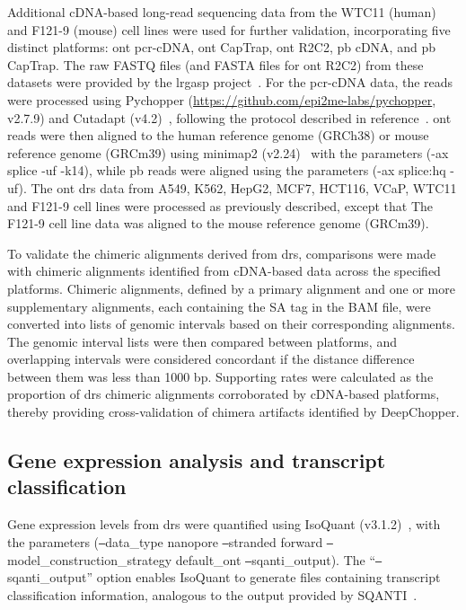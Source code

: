 \documentclass[pdflatex,sn-nature, lineno]{sn-jnl}%
\begin{document}
Additional cDNA-based long-read sequencing data from the WTC11 (human) and F121-9 (mouse) cell lines were used for further validation, incorporating five distinct platforms: \gls{ont} \gls{pcr}-cDNA, \gls{ont} CapTrap, \gls{ont} R2C2, \gls{pb} cDNA, and \gls{pb} CapTrap.
The raw FASTQ files (and FASTA files for \gls{ont} R2C2) from these datasets were provided by the \gls{lrgasp} project~\cite{pardo2024systematic}.
For the \gls{pcr}-cDNA data, the reads were processed using Pychopper (\url{https://github.com/epi2me-labs/pychopper}, v2.7.9) and Cutadapt (v4.2)~\cite{martin2011cutadapt}, following the protocol described in reference~\cite{grunberger2022nanopore}. \gls{ont} reads were then aligned to the human reference genome (GRCh38) or mouse reference genome (GRCm39) using minimap2 (v2.24)~\cite{li2018minimap2} with the parameters (-ax splice -uf -k14), while \gls{pb} reads were aligned using the parameters (-ax splice:hq -uf).
The \gls{ont} \gls{drs} data from A549, K562, HepG2, MCF7, HCT116, VCaP, WTC11 and F121-9 cell lines were processed as previously described, except that The F121-9 cell line data was aligned to the mouse reference genome (GRCm39).

To validate the chimeric alignments derived from \gls{drs}, comparisons were made with chimeric alignments identified from cDNA-based data across the specified platforms.
Chimeric alignments, defined by a primary alignment and one or more supplementary alignments, each containing the SA tag in the BAM file, were converted into lists of genomic intervals based on their corresponding alignments.
The genomic interval lists were then compared between platforms, and overlapping intervals were considered concordant if the distance difference between them was less than 1000 bp.
Supporting rates were calculated as the proportion of \gls{drs} chimeric alignments corroborated by cDNA-based platforms, thereby providing cross-validation of chimera artifacts identified by DeepChopper.

\subsection{Gene expression analysis and transcript classification}

Gene expression levels from \gls{drs} were quantified using IsoQuant (v3.1.2)~\cite{prjibelski2023accurate}, with the parameters (\texttt{--}data\_type nanopore \texttt{--}stranded forward \texttt{--}model\_construction\_strategy default\_ont \texttt{--}sqanti\_output). The ``\texttt{--}sqanti\_output'' option enables IsoQuant to generate files containing transcript classification information, analogous to the output provided by SQANTI~\cite{tardaguila2018sqanti}.
\end{document}
